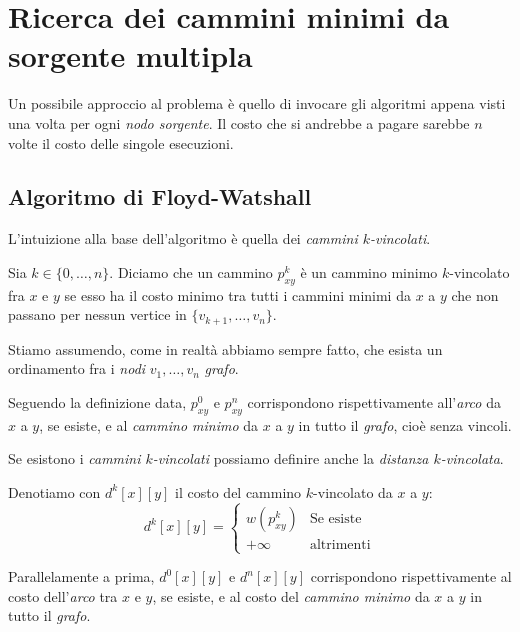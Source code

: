 \section{Ricerca dei cammini minimi da sorgente multipla}
Un possibile approccio al problema è quello di invocare gli algoritmi
appena visti una volta per ogni \emph{nodo sorgente}. Il costo che si
andrebbe a pagare sarebbe $n$ volte il costo delle singole esecuzioni.

\subsection{Algoritmo di Floyd-Watshall}
L'intuizione alla base dell'algoritmo è quella dei \emph{cammini $k$-vincolati}.

\begin{definition}
    Sia $k\in\{0,\dots,n\}$. Diciamo che un cammino $p^k_{xy}$ è un cammino
    minimo $k$-vincolato fra $x$ e $y$ se esso ha il costo minimo tra tutti i
    cammini minimi da $x$ a $y$ che non passano per nessun vertice in $\{v_{k+1},
    \dots,v_n\}$.
\end{definition}
\begin{note}
    Stiamo assumendo, come in realtà abbiamo sempre fatto, che esista un
    ordinamento fra i \emph{nodi} $v_1,\dots,v_n$ \emph{grafo}.
\end{note}
\begin{note}
    Seguendo la definizione data, $p_{xy}^0$ e $p_{xy}^n$ corrispondono
    rispettivamente all'\emph{arco} da $x$ a $y$, se esiste, e al \emph{cammino
    minimo} da $x$ a $y$ in tutto il \emph{grafo}, cioè senza vincoli.
\end{note}

\noindent
Se esistono i \emph{cammini $k$-vincolati} possiamo definire anche la
\emph{distanza $k$-vincolata}.
\begin{definition}
    Denotiamo con $d^k[x][y]$ il costo del cammino $k$-vincolato da $x$ a $y$:
    \[d^k[x][y]=\begin{cases}
        w(p^k_{xy}) & \text{Se esiste}\\
        +\infty & \text{altrimenti}
    \end{cases}\]
\end{definition}
\begin{note}
    Parallelamente a prima, $d^0[x][y]$ e $d^n[x][y]$ corrispondono
    rispettivamente al costo dell'\emph{arco} tra $x$ e $y$, se esiste, e al
    costo del \emph{cammino minimo} da $x$ a $y$ in tutto il \emph{grafo}.
\end{note}

